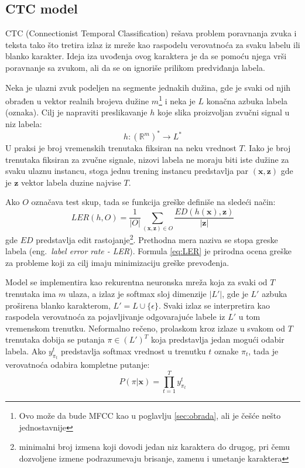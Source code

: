 \documentclass[a4paper]{article}
\begin{document}
\subsection{CTC model}
\label{sec:ctc}

CTC (Connectionist Temporal Classification) rešava problem poravnanja zvuka i teksta tako što tretira izlaz iz mreže kao raspodelu verovatnoća za svaku labelu ili blanko karakter.
Ideja iza uvođenja ovog karaktera je da se pomoću njega vrši poravnanje sa zvukom, ali da se on ignoriše prilikom predviđanja labela.

Neka je ulazni zvuk podeljen na segmente jednakih dužina, gde je svaki od njih obrađen u vektor realnih brojeva dužine $m$\footnote{Ovo može da bude MFCC kao u poglavlju \ref{sec:obrada}, ali je češće nešto jednostavnije} i neka je $L$ konačna azbuka labela (oznaka).
Cilj je napraviti preslikavanje $h$ koje slika proizvoljan zvučni signal u niz labela:
\begin{equation}
\label{eq:pres1}
h: (\mathbb{R}^m)^* \rightarrow L^* 
\end{equation}
U praksi je broj vremenskih trenutaka fiksiran na neku vrednost $T$.
Iako je broj trenutaka fiksiran za zvučne signale, nizovi labela ne moraju biti iste dužine za svaku ulaznu instancu, stoga jednu trening instancu predstavlja par $(\textbf{x}, \textbf{z})$ gde je $\textbf{z}$ vektor labela duzine najvise $T$.

Ako $O$ označava test skup, tada se funkcija greške definiše na sledeći način:
\begin{equation}
\label{eq:LER}
LER(h, O) = \frac{1}{|O|}\sum_{(\textbf{x}, \textbf{z}) \in O}\frac{ED(h(\textbf{x}), \textbf{z})}{\textbf{|z|}}
\end{equation}
gde $ED$ predstavlja edit rastojanje\footnote{minimalni broj izmena koji dovodi jedan niz karaktera do drugog, pri čemu dozvoljene izmene podrazumevaju brisanje, zamenu i umetanje karaktera}. Prethodna mera naziva se stopa greske labela (eng.~{\em label error rate - LER}).
Formula \ref{eq:LER} je prirodna ocena greške za probleme koji za cilj imaju minimizaciju greške prevođenja.

Model se implementira kao rekurentna neuronska mreža koja za svaki od $T$ trenutaka ima $m$ ulaza, a izlaz je softmax sloj dimenzije $|L'|$, gde je $L'$ azbuka proširena blanko karakterom, $L' = L \cup \{\epsilon\}$.
Svaki izlaz se interpretira kao raspodela verovatnoća za pojavljivanje odgovarajuće labele iz $L'$ u tom vremenskom trenutku.
Neformalno rečeno, prolaskom kroz izlaze u svakom od $T$ trenutaka dobija se putanja $\pi \in (L')^T$ koja predstavlja jedan mogući odabir labela.
Ako $y_{\pi_t}^t$ predstavlja softmax vrednost u trenutku $t$ oznake $\pi_t$, tada je verovatnoća odabira kompletne putanje:
\begin{equation*}
  P(\pi|\textbf{x}) = \prod_{t=1}^Ty_{\pi_t}^t
\end{equation*}
\end{document}
